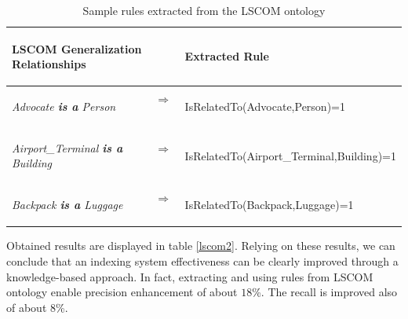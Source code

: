 			\begin{table}
				\centering	
				\caption{Sample rules extracted from the LSCOM ontology}
				\label{tablscom}
				\begin{tabular}{lcl} 
					
					\begin{small}\begin{sffamily}LSCOM Generalization Relationships\end{sffamily} 
					\end{small}& &
					\begin{small}\begin{sffamily}Extracted Rule\end{sffamily}\end{small} \\
					\hline
					\begin{small}\textit{Advocate \textbf{is a} Person} \end{small} & $\Longrightarrow$~~ &
						\begin{small}{\sffamily IsRelatedTo}(Advocate,Person)=1\end{small} \\
					\begin{small}\textit{Airport\_Terminal \textbf{is a} Building} \end{small} &  $\Longrightarrow$~~ &
						\begin{small}{\sffamily IsRelatedTo}(Airport\_Terminal,Building)=1\end{small} \\
					\begin{small}\textit{Backpack \textbf{is a} Luggage} \end{small} &  $\Longrightarrow$~~ &
						\begin{small}{\sffamily IsRelatedTo}(Backpack,Luggage)=1\end{small} \\
							
					\hline 
				\end{tabular}
			\end{table}
		

		Obtained results are displayed in table \ref{lscom2}. Relying on these results, 
		we can conclude that an indexing system effectiveness can be clearly improved through 
		a knowledge-based approach. In fact, extracting and using rules from LSCOM ontology enable
		precision enhancement of about $18$\%. The recall is improved also of about $8$\%.

